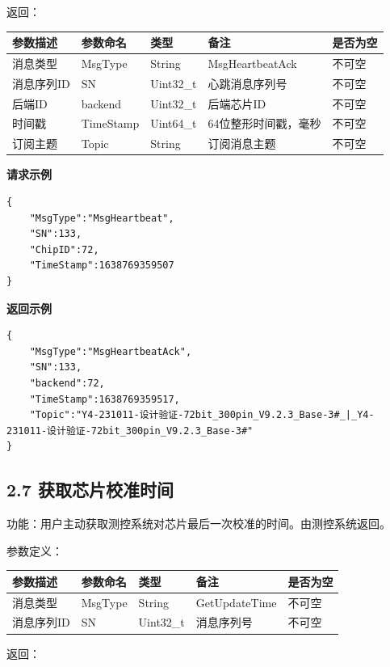 \documentclass{ctexart}
\begin{document}
返回：

\begin{longtable}{|l|l|l|l|l|}
\hline
\textbf{\textbf{参数描述}} & \textbf{\textbf{参数命名}} & \textbf{\textbf{类型}} & \textbf{\textbf{备注}} & \textbf{\textbf{是否为空}} \\
\hline
消息类型 & MsgType & String & MsgHeartbeatAck & 不可空 \\
消息序列ID & SN & Uint32_t & 心跳消息序列号 & 不可空 \\
后端ID & backend & Uint32_t & 后端芯片ID & 不可空 \\
时间戳 & TimeStamp & Uint64_t & 64位整形时间戳，毫秒 & 不可空 \\
订阅主题 & Topic & String & 订阅消息主题 & 不可空 \\
\hline
\end{longtable}

\textbf{请求示例}

\begin{verbatim}{
    "MsgType":"MsgHeartbeat",
    "SN":133,
    "ChipID":72,
    "TimeStamp":1638769359507
}\end{verbatim}

\textbf{返回示例}

\begin{verbatim}{
    "MsgType":"MsgHeartbeatAck",
    "SN":133,
    "backend":72,
    "TimeStamp":1638769359517,
    "Topic":"Y4-231011-设计验证-72bit_300pin_V9.2.3_Base-3#_|_Y4-231011-设计验证-72bit_300pin_V9.2.3_Base-3#"
}\end{verbatim}

\subsection{2.7 获取芯片校准时间}

功能：用户主动获取测控系统对芯片最后一次校准的时间。由测控系统返回。

参数定义：

\begin{longtable}{|l|l|l|l|l|}
\hline
\textbf{\textbf{参数描述}} & \textbf{\textbf{参数命名}} & \textbf{\textbf{类型}} & \textbf{\textbf{备注}} & \textbf{\textbf{是否为空}} \\
\hline
消息类型 & MsgType & String & GetUpdateTime & 不可空 \\
消息序列ID & SN & Uint32_t & 消息序列号 & 不可空 \\
\hline
\end{longtable}

返回：
\end{document}
